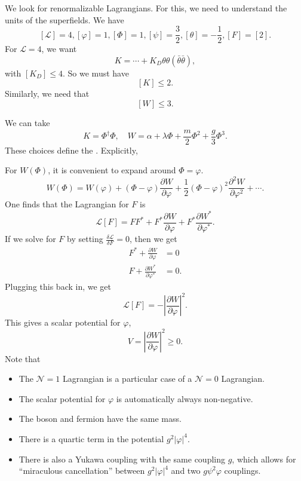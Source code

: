 \documentclass[a4paper]{article}
\begin{document}
We look for renormalizable Lagrangians. For this, we need to understand the units of the superfields. We have
\[
  [\mathcal{L}] = 4, [\varphi] = 1, [\Phi] = 1, [\psi] = \frac{3}{2}, [\theta] = -\frac{1}{2}, [F] = [2].
\]
For $\mathcal{L} = 4$, we want
\[
  K = \cdots + K_D \theta \theta (\bar{\theta} \bar{\theta}),
\]
with $[K_D] \leq 4$. So we must have
\[
  [K] \leq 2.
\]
Similarly, we need that
\[
  [W] \leq 3.
\]
\begin{eg}
  We can take
  \[
    K = \Phi^\dagger \Phi,\quad W = \alpha + \lambda \Phi + \frac{m}{2} \Phi^2 + \frac{g}{3} \Phi^3.
  \]
  These choices define the . Explicitly, %
\end{eg}
For $W(\Phi)$, it is convenient to expand around $\Phi = \varphi$.
\[
  W(\Phi) = W(\varphi) + (\Phi - \varphi) \frac{\partial W}{\partial \varphi} + \frac{1}{2} (\Phi - \varphi)^2 \frac{\partial^2 W}{\partial \varphi^2} + \cdots.
\]
One finds that the Lagrangian for $F$ is
\[
  \mathcal{L}[F] = FF^* + F^* \frac{\partial W}{\partial \varphi} + F^* \frac{\partial W^*}{\partial \varphi^*}.
\]
If we solve for $F$ by setting $\frac{\delta \mathcal{L}}{\delta F} = 0$, then we get
\begin{align*}
  F^* + \frac{\partial W}{\partial \varphi} &= 0\\
  F + \frac{\partial W^*}{\partial \varphi^*} &= 0.
\end{align*}
Plugging this back in, we get
\[
  \mathcal{L}[F] = - \left|\frac{\partial W}{\partial \varphi}\right|^2.
\]
This gives a scalar potential for $\varphi$,
\[
  V = \left|\frac{\partial W}{\partial \varphi}\right|^2 \geq 0.
\]
Note that
\begin{itemize}
  \item The $\mathcal{N} = 1$ Lagrangian is a particular case of a $\mathcal{N} = 0$ Lagrangian.
  \item The scalar potential for $\varphi$ is automatically always non-negative.
  \item The boson and fermion have the same mass.
  \item There is a quartic term in the potential $g^2 |\varphi|^4$.
  \item There is also a Yukawa coupling with the same coupling $g$, which allows for ``miraculous cancellation'' between $g^2 |\varphi|^4$ and two $g \psi^2 \varphi$ couplings. %
\end{itemize}
\end{document}
